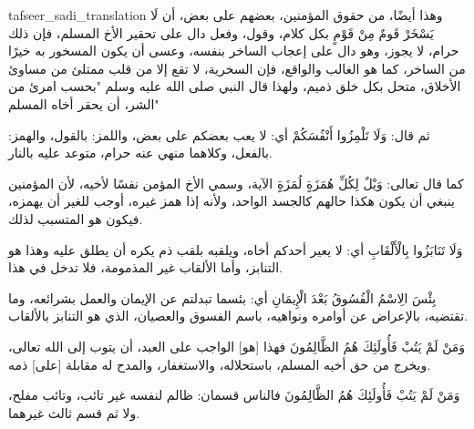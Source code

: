 \begin{taggedblock}{tafseer_sadi_translation}
وهذا أيضًا، من حقوق المؤمنين، بعضهم على بعض، أن
{ لَا يَسْخَرْ قَومٌ مِنْ قَوْمٍ }
بكل كلام، وقول، وفعل دال على تحقير الأخ المسلم، فإن ذلك حرام، لا يجوز، وهو دال على إعجاب الساخر بنفسه، وعسى أن يكون المسخور به خيرًا من الساخر، كما هو  الغالب والواقع، فإن السخرية، لا تقع إلا من قلب ممتلئ من مساوئ الأخلاق، متحل بكل خلق ذميم، ولهذا قال النبي صلى الله عليه وسلم
"بحسب امرئ من الشر، أن يحقر أخاه المسلم"

ثم قال:
{ وَلَا تَلْمِزُوا أَنْفُسَكُمْ }
أي: لا يعب بعضكم على بعض، واللمز: بالقول، والهمز: بالفعل، وكلاهما منهي عنه حرام، متوعد عليه بالنار.

كما قال تعالى:
{ وَيْلٌ لِكُلِّ هُمَزَةٍ لُمَزَةٍ }
الآية، وسمي الأخ المؤمن  نفسًا لأخيه، لأن المؤمنين ينبغي أن يكون هكذا حالهم كالجسد الواحد، ولأنه إذا همز غيره، أوجب للغير أن يهمزه، فيكون هو المتسبب لذلك.

{ وَلَا تَنَابَزُوا بِالْأَلْقَابِ }
أي: لا يعير أحدكم أخاه، ويلقبه بلقب ذم يكره أن يطلق عليه  وهذا هو التنابز، وأما الألقاب غير المذمومة، فلا تدخل في هذا.

{ بِئْسَ الِاسْمُ الْفُسُوقُ بَعْدَ الْإِيمَانِ }
أي: بئسما تبدلتم عن الإيمان والعمل بشرائعه، وما تقتضيه، بالإعراض عن أوامره ونواهيه، باسم الفسوق والعصيان، الذي هو التنابز بالألقاب.

{ وَمَنْ لَمْ يَتُبْ فَأُولَئِكَ هُمُ الظَّالِمُونَ }
فهذا
[هو]
الواجب على العبد، أن يتوب إلى الله تعالى، ويخرج من حق أخيه المسلم، باستحلاله، والاستغفار، والمدح له مقابلة
[على]
ذمه.

{ وَمَنْ لَمْ يَتُبْ فَأُولَئِكَ هُمُ الظَّالِمُونَ }
فالناس قسمان: ظالم لنفسه غير تائب، وتائب مفلح، ولا ثم قسم ثالث غيرهما.
\end{taggedblock}

\begin{comment}
Please use the following for footnotes:- Sample\footnoteQ{Text of Qur'an footnote goes here.}.
Sample\footnoteT{Text of Tafseer footnote goes here.}.
\end{comment}